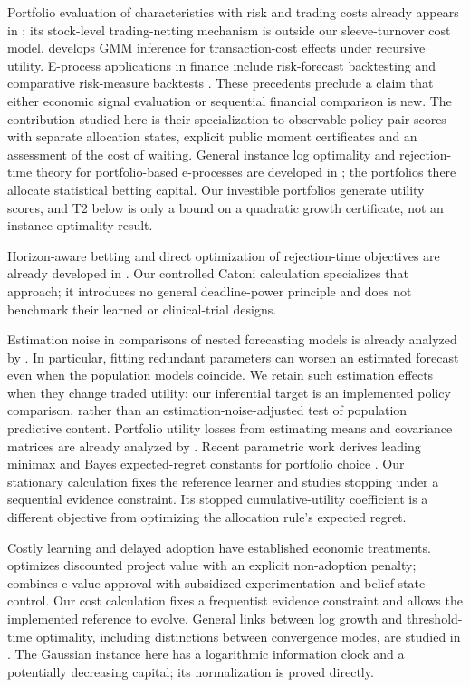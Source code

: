 \documentclass[11pt,a4paper]{article}
\theoremstyle{remark}\newtheorem{remark}[theorem]{Remark}
\begin{document}
Portfolio evaluation of characteristics with risk and trading costs already
appears in \cite{demiguel}; its stock-level trading-netting mechanism is outside
our sleeve-turnover cost model. \cite{carrasco} develops GMM inference for
transaction-cost effects under recursive utility. E-process applications in
finance include risk-forecast backtesting \cite{eback} and comparative
risk-measure backtests \cite{comparativeback}. These precedents preclude a
claim that either economic signal evaluation or sequential financial comparison
is new. The contribution studied here is their specialization to observable
policy-pair scores with separate allocation states, explicit public moment
certificates and an assessment of the cost of waiting. General instance log
optimality and rejection-time theory for portfolio-based e-processes are
developed in \cite{instance}; the portfolios there allocate statistical betting
capital. Our investible portfolios generate utility scores, and T2 below is
only a bound on a quadratic growth certificate, not an instance optimality
result.

Horizon-aware betting and direct optimization of rejection-time objectives
are already developed in \cite{taga,clerico,baas}. Our controlled Catoni
calculation specializes that approach; it introduces no general deadline-power
principle and does not benchmark their learned or clinical-trial designs.

Estimation noise in comparisons of nested forecasting models is already
analyzed by \cite{clarkmccracken,clarkwest}. In particular, fitting redundant
parameters can worsen an estimated forecast even when the population models
coincide. We retain such estimation effects when they change traded utility:
our inferential target is an implemented policy comparison, rather than an
estimation-noise-adjusted test of population predictive content.
Portfolio utility losses from estimating means and covariance matrices are
already analyzed by \cite{kanzhou}. Recent parametric work derives leading
minimax and Bayes expected-regret constants for portfolio choice
\cite{katoportfolio}. Our stationary calculation fixes the reference learner
and studies stopping under a sequential evidence constraint. Its stopped
cumulative-utility coefficient is a different objective from optimizing the
allocation rule's expected regret.

Costly learning and delayed adoption have established economic treatments.
\cite{costlyexperimentation} optimizes discounted project value with an explicit
non-adoption penalty; \cite{socialutility} combines e-value approval with
subsidized experimentation and belief-state control. Our cost calculation
fixes a frequentist evidence constraint and allows the implemented reference
to evolve. General links between log growth and threshold-time optimality,
including distinctions between convergence modes, are studied in
\cite{waitoptimal}. The Gaussian instance here has a logarithmic information
clock and a potentially decreasing capital; its normalization is proved directly.
\end{document}
